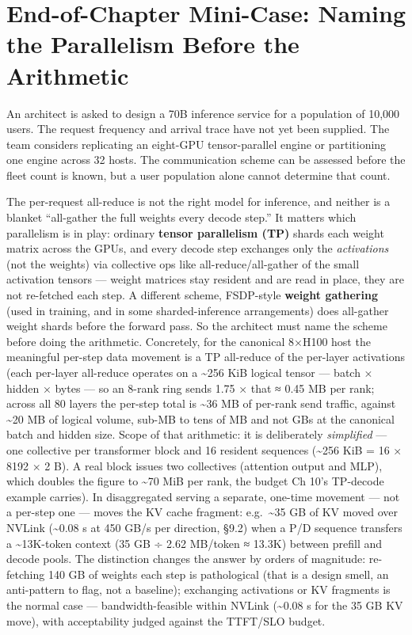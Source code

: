 \section{End-of-Chapter Mini-Case: Naming the Parallelism Before the
Arithmetic}\label{end-of-chapter-mini-case-naming-the-parallelism-before-the-arithmetic}

An architect is asked to design a 70B inference service for a population
of 10,000 users. The request frequency and arrival trace have not yet
been supplied. The team considers replicating an eight-GPU
tensor-parallel engine or partitioning one engine across 32 hosts. The
communication scheme can be assessed before the fleet count is known,
but a user population alone cannot determine that count.

The per-request all-reduce is not the right model for inference, and
neither is a blanket ``all-gather the full weights every decode step.''
It matters which parallelism is in play: ordinary \textbf{tensor
parallelism (TP)} shards each weight matrix across the GPUs, and every
decode step exchanges only the \emph{activations} (not the weights) via
collective ops like all-reduce/all-gather of the small activation
tensors --- weight matrices stay resident and are read in place, they
are not re-fetched each step. A different scheme, FSDP-style
\textbf{weight gathering} (used in training, and in some
sharded-inference arrangements) does all-gather weight shards before the
forward pass. So the architect must name the scheme before doing the
arithmetic. Concretely, for the canonical 8×H100 host the meaningful
per-step data movement is a TP all-reduce of the per-layer activations
(each per-layer all-reduce operates on a \textasciitilde256 KiB logical
tensor --- batch × hidden × bytes --- so an 8-rank ring sends 1.75 ×
that ≈ 0.45 MB per rank; across all 80 layers the per-step total is
\textasciitilde36 MB of per-rank send traffic, against \textasciitilde20
MB of logical volume, sub-MB to tens of MB and not GBs at the canonical
batch and hidden size. Scope of that arithmetic: it is deliberately
\emph{simplified} --- one collective per transformer block and 16
resident sequences (\textasciitilde256 KiB = 16 × 8192 × 2 B). A real
block issues two collectives (attention output and MLP), which doubles
the figure to \textasciitilde70 MiB per rank, the budget Ch 10's
TP-decode example carries). In disaggregated serving a separate,
one-time movement --- not a per-step one --- moves the KV cache
fragment: e.g.~\textasciitilde35 GB of KV moved over NVLink
(\textasciitilde0.08 s at 450 GB/s per direction, §9.2) when a P/D
sequence transfers a \textasciitilde13K-token context (35 GB ÷ 2.62
MB/token ≈ 13.3K) between prefill and decode pools. The distinction
changes the answer by orders of magnitude: re-fetching 140 GB of weights
each step is pathological (that is a design smell, an anti-pattern to
flag, not a baseline); exchanging activations or KV fragments is the
normal case --- bandwidth-feasible within NVLink (\textasciitilde0.08 s
for the 35 GB KV move), with acceptability judged against the TTFT/SLO
budget.

